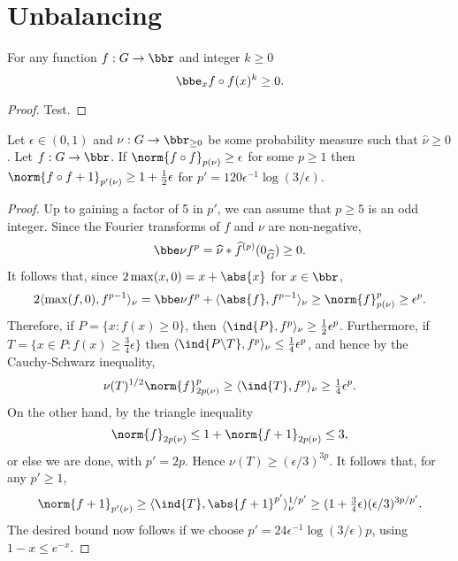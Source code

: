 \chapter{Unbalancing}

\begin{lemma}
\label{nonneg_moments}
\leanok
For any function $f:G\to\bbr$ and integer $k\geq 0$
\[\bbe_x f\circ f(x)^k\geq 0.\]
\end{lemma}
\begin{proof}
\leanok
Test.
\end{proof}

\begin{lemma}
\label{unbalancing}
\leanok
Let $\epsilon\in(0,1)$ and $\nu:G\to\bbr_{\geq 0}$ be some probability measure such that $\widehat{\nu}\geq 0$. Let $f:G\to\bbr$. If $\norm{f\circ f}_{p(\nu)}\geq \epsilon$ for some $p\geq 1$ then $\norm{f\circ f+1}_{p'(\nu)}\geq 1+\tfrac{1}{2}\epsilon$ for $p'=120\epsilon^{-1}\log(3/\epsilon)$.
\end{lemma}

\begin{proof}
\leanok
Up to gaining a factor of 5 in $p'$, we can assume that $p\geq 5$ is an odd integer. %
Since the Fourier transforms of $f$ and $\nu$ are non-negative,
\[\bbe \nu f^{p}= \widehat{\nu}\ast\widehat{f}^{(p)}(0_{\widehat{G}})\geq 0.\]
It follows that, since $2\max(x,0)=x+\abs{x}$ for $x\in\bbr$,
\[2\langle \max(f,0),f^{p-1}\rangle_\nu=\bbe \nu f^{p}+\langle \abs{f},f^{p-1}\rangle_\nu\geq \norm{f}_{p(\nu)}^p\geq \epsilon^p.\]
Therefore, if $P=\{ x : f(x) \geq 0\}$, then $\langle \ind{P},f^{p}\rangle_\nu\geq \frac{1}{2}\epsilon^{p}$. Furthermore, if $T=\{ x\in P : f(x) \geq \tfrac{3}{4}\epsilon\}$ then $\langle \ind{P\backslash T},f^p\rangle_\nu \leq \tfrac{1}{4}\epsilon^{p}$, and hence by the Cauchy-Schwarz inequality,
\[\nu(T)^{1/2}\norm{f}_{2p(\nu)}^{p}\geq \langle \ind{T}, f^{p}\rangle_\nu \geq \tfrac{1}{4}\epsilon^{p}.\]
On the other hand, by the triangle inequality
\[\norm{f}_{2p(\nu)}\leq 1+\norm{f+1}_{2p(\nu)}\leq 3,\]
or else we are done, with $p'=2p$. Hence $\nu(T)\geq (\epsilon/3)^{3p}$. It follows that, for any $p'\geq 1$,
\[\norm{f+1}_{p'(\nu)}\geq \langle \ind{T},\abs{f+1}^{p'}\rangle_\nu^{1/p'}\geq  (1+\tfrac{3}{4}\epsilon)(\epsilon/3)^{3p/p'}.\]
The desired bound now follows if we choose $p'=24\epsilon^{-1}\log(3/\epsilon)p$, using $1-x\leq e^{-x}$.
\end{proof}

